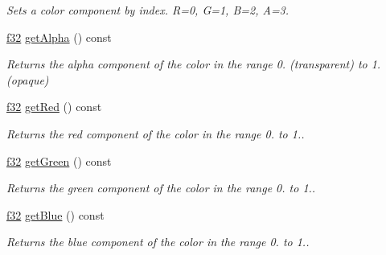 \begin{DoxyCompactItemize}
\begin{DoxyCompactList}\small\item\em Sets a color component by index. R=0, G=1, B=2, A=3. \end{DoxyCompactList}\item 
\hyperlink{namespaceirr_a0277be98d67dc26ff93b1a6a1d086b07}{f32} \hyperlink{classirr_1_1video_1_1SColorf_a01e38f4fee055d085530baac54dacb67}{get\+Alpha} () const \hypertarget{classirr_1_1video_1_1SColorf_a01e38f4fee055d085530baac54dacb67}{}\label{classirr_1_1video_1_1SColorf_a01e38f4fee055d085530baac54dacb67}

\begin{DoxyCompactList}\small\item\em Returns the alpha component of the color in the range 0. (transparent) to 1. (opaque) \end{DoxyCompactList}\item 
\hyperlink{namespaceirr_a0277be98d67dc26ff93b1a6a1d086b07}{f32} \hyperlink{classirr_1_1video_1_1SColorf_abf88944ab00a08054cecaefe65e6d485}{get\+Red} () const \hypertarget{classirr_1_1video_1_1SColorf_abf88944ab00a08054cecaefe65e6d485}{}\label{classirr_1_1video_1_1SColorf_abf88944ab00a08054cecaefe65e6d485}

\begin{DoxyCompactList}\small\item\em Returns the red component of the color in the range 0. to 1.. \end{DoxyCompactList}\item 
\hyperlink{namespaceirr_a0277be98d67dc26ff93b1a6a1d086b07}{f32} \hyperlink{classirr_1_1video_1_1SColorf_a9b12565067e4606afe7dcdf3c34c232d}{get\+Green} () const \hypertarget{classirr_1_1video_1_1SColorf_a9b12565067e4606afe7dcdf3c34c232d}{}\label{classirr_1_1video_1_1SColorf_a9b12565067e4606afe7dcdf3c34c232d}

\begin{DoxyCompactList}\small\item\em Returns the green component of the color in the range 0. to 1.. \end{DoxyCompactList}\item 
\hyperlink{namespaceirr_a0277be98d67dc26ff93b1a6a1d086b07}{f32} \hyperlink{classirr_1_1video_1_1SColorf_ad4c669bb1966d58ec9b5eb6b564531c0}{get\+Blue} () const \hypertarget{classirr_1_1video_1_1SColorf_ad4c669bb1966d58ec9b5eb6b564531c0}{}\label{classirr_1_1video_1_1SColorf_ad4c669bb1966d58ec9b5eb6b564531c0}

\begin{DoxyCompactList}\small\item\em Returns the blue component of the color in the range 0. to 1.. \end{DoxyCompactList}\end{DoxyCompactItemize}
